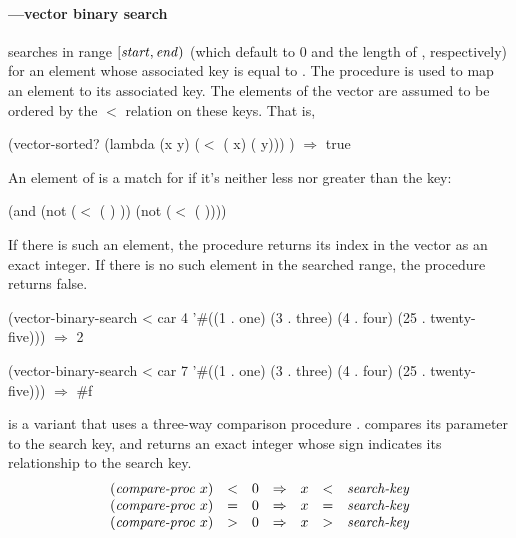 \paragraph{---vector binary search}

\begin{protos}
\end{protos}

 searches  in range
\([\var{start},\var{end})\) (which default to 0 and the length of
, respectively) for an element whose
associated key is equal to . The procedure  is used to map
an element to its associated key. The elements of the vector are assumed
to be ordered by the $<$ relation on these keys. That is, 

\begin{example}
(vector-sorted? (lambda (x y) (\(<\) ( x) ( y)))
                  ) \(\Longrightarrow\) true
\end{example}

An element  of  is a match for  if it's
neither less nor greater than the key:

\begin{example}
(and (not (\(<\) ( ) ))
     (not (\(<\)  ( ))))
\end{example}

If there is such an element, the procedure returns its index in the
vector as an exact integer. If there is no such element in the searched 
range, the procedure returns false.

\begin{example}
(vector-binary-search < car 4 '\#((1 . one) (3 . three)
                                 (4 . four) (25 . twenty-five)))
\(\Longrightarrow\) 2

(vector-binary-search < car 7 '\#((1 . one) (3 . three)
                                 (4 . four) (25 . twenty-five)))
\(\Longrightarrow\) \#f
\end{example}    

 is a variant that uses a three-way comparison
procedure .  compares its
parameter to the search key, and returns an
exact integer whose sign indicates its relationship to the search key.
%
\[
  \begin{array}{rclcrcl}
      (\var{compare-proc}~x) &<& 0& \Rightarrow&  x &<& \var{search-key}\\
      (\var{compare-proc}~x) &=& 0& \Rightarrow&  x &=& \var{search-key}\\
      (\var{compare-proc}~x) &>& 0& \Rightarrow&  x &>& \var{search-key}
  \end{array}
\]

